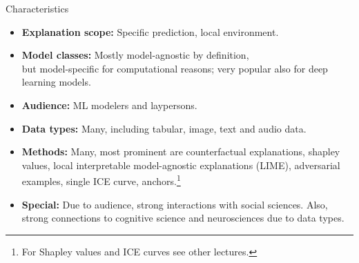 \documentclass[11pt,compress,t,notes=noshow, aspectratio=169, xcolor=table]{beamer}
\begin{document}
\begin{vbframe}[c]{Characteristics}
	\begin{itemize}
		\item \textbf{Explanation scope:} Specific prediction, local environment.
		\item \textbf{Model classes:} Mostly model-agnostic by definition,\\ but model-specific for computational reasons; very popular also for deep learning models.
		\item \textbf{Audience:} ML modelers and laypersons.
		\item \textbf{Data types:} Many, including tabular, image, text and audio data.
		\item \textbf{Methods:} Many, most prominent are counterfactual explanations, shapley values, local interpretable model-agnostic explanations (LIME), adversarial examples, single ICE curve, anchors.\footnote{For Shapley values and ICE curves see other lectures.}
		\item \textbf{Special:} Due to audience, strong interactions with social sciences. Also, strong connections to cognitive science and neurosciences due to data types.
	\end{itemize}
\end{vbframe}

\end{document}
